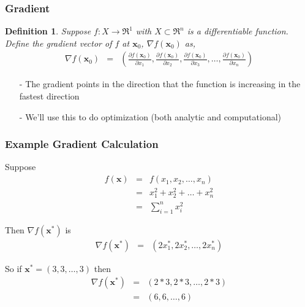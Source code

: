 \documentclass{beamer}
\newtheorem{defn}{Definition}
\numberwithin{equation}{section}
\begin{document}
\begin{frame}
\frametitle{Gradient} 

\begin{defn} 
Suppose $f:X \rightarrow \Re^{1}$ with $X \subset \Re^{n}$ is a differentiable function.  Define the gradient vector of $f$ at $\boldsymbol{x}_{0}$, $\nabla f(\boldsymbol{x}_{0})$ as, 
\begin{eqnarray}
\nabla f (\boldsymbol{x}_{0})  & = & \left(\frac{\partial f (\boldsymbol{x}_{0}) }{\partial x_{1} }, \frac{\partial f (\boldsymbol{x}_{0}) }{\partial x_{2} }, \frac{\partial f (\boldsymbol{x}_{0}) }{\partial x_{3} }, \hdots, \frac{\partial f (\boldsymbol{x}_{0}) }{\partial x_{n} } \right) \nonumber 
\end{eqnarray}

\end{defn}

\begin{itemize}
\item[-] The gradient points in the direction that the function is \alert{increasing} in the fastest direction
\item[-] We'll use this to do optimization (both analytic and computational)
\end{itemize}



\end{frame}


\begin{frame}
\frametitle{Example Gradient Calculation}

Suppose 
\begin{eqnarray}
f(\boldsymbol{x} ) & = &  f(x_{1}, x_{2}, \hdots, x_{n}) \nonumber \\
							& = & x_{1}^2 + x_{2}^2 + \hdots + x_{n}^2 \nonumber \\ 
							&= & \sum_{i=1}^{n} x_{i}^{2} \nonumber 
\end{eqnarray}							

Then $\nabla f(\boldsymbol{x}^{*})$ is 
\begin{eqnarray}
\nabla f(\boldsymbol{x}^{*}) & = & \left( 2 x_{1}^{*}, 2 x_{2}^{*}, \hdots, 2 x_{n}^{*} \right) \nonumber 
\end{eqnarray}

So if $\boldsymbol{x}^{*} = (3, 3, \hdots, 3)$ then 
\begin{eqnarray}
\nabla f(\boldsymbol{x}^{*}) & = & (2*3, 2*3, \hdots, 2 *3) \nonumber \\
										& = & (6, 6, \hdots, 6) \nonumber 
\end{eqnarray}





\end{frame}
\end{document}
